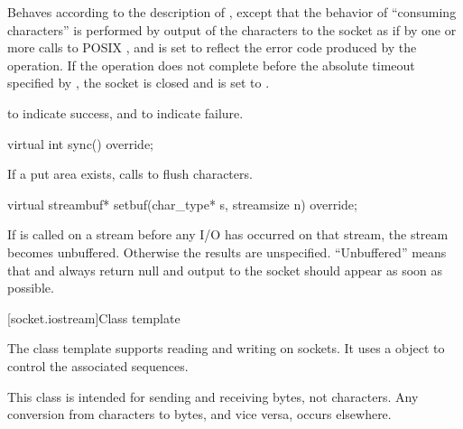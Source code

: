 \begin{itemdescr}
\pnum
\effects Behaves according to the description of , except that the behavior of ``consuming characters'' is performed by output of the characters to the socket as if by one or more calls to POSIX , and  is set to reflect the error code produced by the operation. If the operation does not complete before the absolute timeout specified by , the socket is closed and  is set to .

\pnum
\returns {} to indicate success, and  to indicate failure.
\end{itemdescr}

\begin{itemdecl}
virtual int sync() override;
\end{itemdecl}

\begin{itemdescr}
\pnum
\effects If a put area exists, calls  to flush characters.
\end{itemdescr}

\begin{itemdecl}
virtual streambuf* setbuf(char_type* s, streamsize n) override;
\end{itemdecl}

\begin{itemdescr}
\pnum
\effects If  is called on a stream before any I/O has occurred on that stream, the stream becomes unbuffered. Otherwise the results are unspecified. ``Unbuffered'' means that  and  always return null and output to the socket should appear as soon as possible.
\end{itemdescr}




[socket.iostream]{Class template }

\pnum
The class template  supports reading and writing on sockets. It uses a  object to control the associated sequences.

\pnum
 \begin{note} This class is intended for sending and receiving bytes, not characters. Any conversion from characters to bytes, and vice versa, occurs elsewhere. \end{note}

